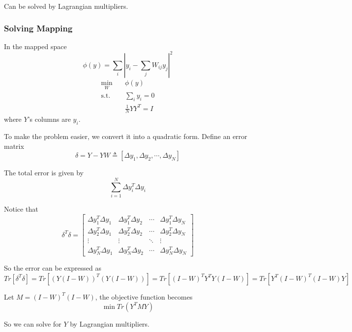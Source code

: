         Can be solved by Lagrangian multipliers.

        \subsubsection{Solving Mapping}
        In the mapped space
        \[ \phi(y) = \sum_i\left| y_i - \sum_j W_{ij}y_j \right|^2 \]
        \begin{align*}
            \min_W &\quad \phi(y)\\
            \text{s.t.} &\quad \sum_i y_i = 0\\
            &\quad \frac{1}{N} YY^T = I
        \end{align*}
        where $Y$'s columns are $y_i$.

        To make the problem easier, we convert it into a quadratic form. Define an error matrix
        \[ \delta = Y-YW \triangleq [\Delta y_1,\Delta y_2,\cdots,\Delta y_N]\]

        The total error is given by
        \[ \sum_{i=1}^N \Delta y_i^T \Delta y_i \]

        Notice that
        \[ \delta^T\delta = \begin{bmatrix}
            \Delta y_1^T \Delta y_1 & \Delta y_1^T \Delta y_2 & \cdots & \Delta y_1^T \Delta y_N\\
            \Delta y_2^T \Delta y_1 & \Delta y_2^T \Delta y_2 & \cdots & \Delta y_2^T \Delta y_N\\
            \vdots & \vdots & \ddots & \vdots\\
            \Delta y_N^T \Delta y_1 & \Delta y_N^T \Delta y_2 & \cdots & \Delta y_N^T \Delta y_N
        \end{bmatrix} \]

        So the error can be expressed as
        \[ Tr[\delta^T\delta] = Tr[(Y(I-W))^T(Y(I-W))] = Tr[(I-W)^TY^TY(I-W)] = Tr[Y^T(I-W)^T(I-W)Y] \]

        Let $M = (I-W)^T(I-W)$, the objective function becomes
        \[ \min Tr(Y^TMY) \]

        So we can solve for $Y$ by Lagrangian multipliers.

